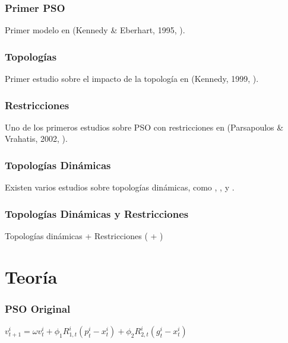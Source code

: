 \documentclass[10pt, compress]{beamer}
\begin{document}
\begin{frame}[fragile]
  \frametitle{Primer PSO}
    \begin{center}
        Primer modelo en (Kennedy \& Eberhart, 1995, \cite{kennedy95}). 
    \end{center}{}
\end{frame}

\begin{frame}[fragile]
  \frametitle{Topologías}
    \begin{center}
        Primer estudio sobre el impacto de la topología en (Kennedy, 1999, \cite{kennedy99}). 
    \end{center}{}
\end{frame}

\begin{frame}[fragile]
  \frametitle{Restricciones}
    \begin{center}
        Uno de los primeros estudios sobre PSO con restricciones en  (Parsapoulos \& Vrahatis, 2002, \cite{parsopoulos02}). 
    \end{center}{}
\end{frame}

\begin{frame}[fragile]
  \frametitle{Topologías Dinámicas}
    \begin{center}
        Existen varios estudios sobre topologías dinámicas, como \cite{clerc06}, \cite{suganthan99}, \cite{marinakis13} y \cite{lim14}. 
    \end{center}{}
\end{frame}

\begin{frame}[fragile]
  \frametitle{Topologías Dinámicas y  Restricciones}
    \begin{center}
        Topologías dinámicas + Restricciones (\cite{bonyadi14} + \cite{bonyadi14_2}) 
    \end{center}{}
\end{frame}

\section{Teoría}

\begin{frame}[fragile]
  \frametitle{PSO Original}
    \begin{center}
         $v_{t + 1}^i = \omega v_t^i + \phi_1 R_{1,t}^i(p_t^i- x_t^i) + \phi_2 R_{2,t}^i(g_t^i- x_t^i) $
    \end{center}{}
\end{frame}
\end{document}
